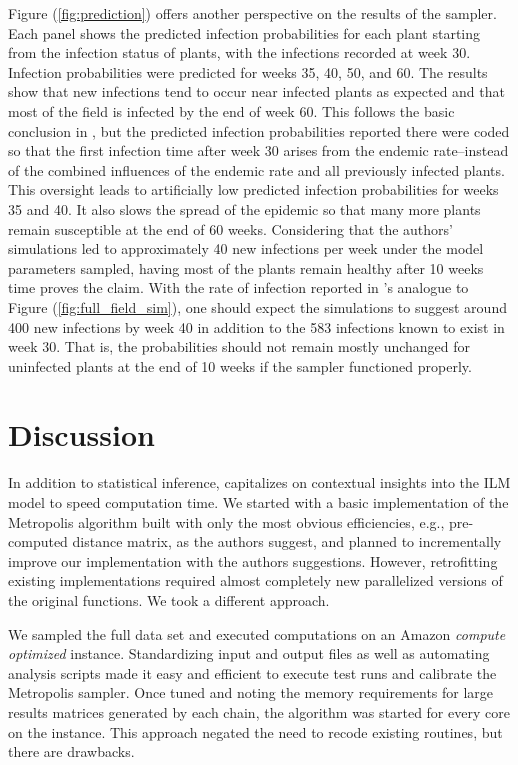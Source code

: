\documentclass{uwstat572}
\begin{document}
Figure (\ref{fig:prediction}) offers another perspective on the results of the sampler. 
Each panel shows the predicted infection probabilities for each plant starting from the infection status of plants, with the infections recorded at week 30. 
Infection probabilities were predicted for weeks 35, 40, 50, and 60. 
The results show that new infections tend to occur near infected plants as expected and that most of the field is infected by the end of week 60. 
This follows the basic conclusion in \citet{Brown}, but the predicted infection probabilities reported there were coded so that the first infection time after week 30 arises from the endemic rate--instead of the combined influences of the endemic rate and all previously infected plants.
This oversight leads to artificially low predicted infection probabilities for weeks 35 and 40. 
It also slows the spread of the epidemic so that many more plants remain susceptible at the end of 60 weeks.
Considering that the authors' simulations led to approximately 40 new infections per week under the model parameters sampled, having most of the plants remain healthy after 10 weeks time proves the claim. 
With the rate of infection reported in \citep{Brown}'s analogue to Figure (\ref{fig:full_field_sim}), one should expect the simulations to suggest around 400 new infections by week 40 in addition to the 583 infections known to exist in week 30. 
That is, the probabilities should not remain mostly unchanged for uninfected plants at the end of 10 weeks if the sampler functioned properly. 

\section{Discussion}
In addition to statistical inference, \citet{Brown} capitalizes on contextual insights into the ILM model to speed computation time.  
We started with a basic implementation of the Metropolis algorithm built with only the most obvious efficiencies, e.g., pre-computed distance matrix, as the authors suggest, and planned to incrementally improve our implementation with the authors suggestions.
However, retrofitting existing implementations required almost completely new parallelized versions of the original functions. 
We took a different approach. 

We sampled the full data set and executed computations on an Amazon \textit{compute optimized} instance. 
Standardizing input and output files as well as automating analysis scripts made it easy and efficient to execute test runs and calibrate the Metropolis sampler. 
Once tuned and noting the memory requirements for large results matrices generated by each chain,
the algorithm was started for every core on the instance. 
This approach negated the need to recode existing routines, but there are drawbacks. 
\end{document}
